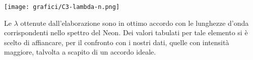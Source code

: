 \begin{center}
\end{center}

\begin{center}
\texttt{[image: grafici/C3-lambda-n.png]}
\end{center}




Le $\lambda$ ottenute dall'elaborazione sono in ottimo accordo con le lunghezze d'onda corrispondenti nello spettro del Neon. Dei valori tabulati per tale elemento si è scelto di affiancare, per il confronto con i nostri dati, quelle con intensità maggiore, talvolta a scapito di un accordo ideale.





